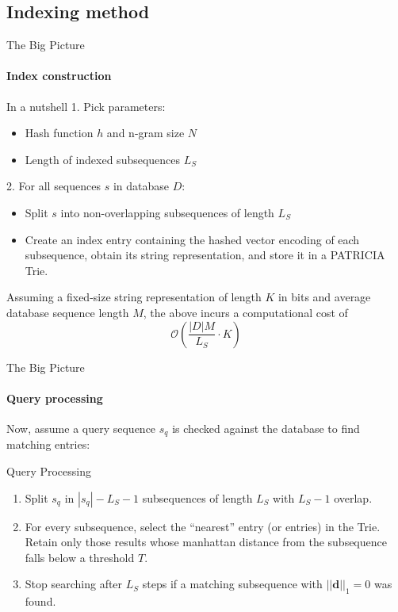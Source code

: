 \documentclass[9pt]{beamer}
\begin{document}
\subsection{Indexing method}
\begin{frame}{The Big Picture}
	\framesubtitle{Index construction}
	\begin{block}{In a nutshell}
		1. Pick parameters:
		\begin{itemize}
			\item Hash function $h$ and n-gram size $N$
			\item Length of indexed subsequences $L_S$
		\end{itemize}
		2. For all sequences $s$ in database $D$:
		\begin{itemize}
			\item Split $s$ into non-overlapping subsequences of length $L_S$
			\item Create an index entry containing the hashed vector encoding of each subsequence, obtain its string representation, and store it in a PATRICIA Trie.
		\end{itemize}
	\end{block}
	Assuming a fixed-size string representation of length $K$ in bits and average database sequence length $M$, the above incurs a computational cost of
	\[
		\mathcal{O}\left( \frac{|D|M}{L_S} \cdot K \right)
	\]
	
\end{frame}
\begin{frame}{The Big Picture}
	\framesubtitle{Query processing}
	Now, assume a query sequence $s_q$ is checked against the database to find matching entries:
	\begin{block}{Query Processing}
		\begin{enumerate} 
		\item<1-> Split $s_q$ in $|s_q| - L_S - 1$ subsequences of length $L_S$ with $L_S - 1$ overlap. 
		\item<2-> For every subsequence, select the ``nearest'' entry (or entries) in the Trie. Retain only those results whose manhattan distance from the subsequence falls below a threshold $T$.
		\item<3-> Stop searching after $L_S$ steps if a matching subsequence with $||\mathbf{d}||_1 = 0$ was found.
		\end{enumerate}
	\end{block}
\end{frame}
\end{document}
